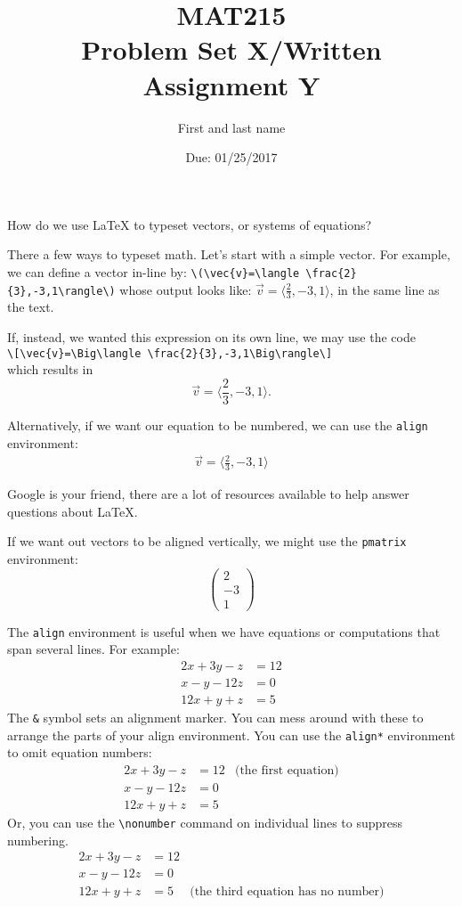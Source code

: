 \documentclass[12pt]{article}
\title{MAT215\\Problem Set X/Written Assignment Y}
\author{First and last name}
\date{Due: 01/25/2017}
\newenvironment{problem}[2][Problem]
{
	\begin{trivlist} 
		\item[\hskip \labelsep {\bfseries #1 #2:}]
	}
{
	\end{trivlist}
	}
\newenvironment{solution}[1][Solution]
{
	\begin{trivlist} 
		\item[\hskip \labelsep {\itshape #1:}]
	}
	{
	\end{trivlist}
}
\begin{document}
\maketitle
\newpage
%
%
\begin{problem}{7}
	How do we use {\LaTeX} to typeset vectors, or systems of equations?
\end{problem}
%
\begin{solution}
	There a few ways to typeset math. Let's start with a simple vector. For example, we can define a vector in-line by: \verb|\(\vec{v}=\langle \frac{2}{3},-3,1\rangle\)| whose output looks like: \(\vec{v}=\langle \frac{2}{3},-3,1\rangle\), in the same line as the text.
	
	If, instead, we wanted this expression on its own line, we may use the code\\
	\verb|\[\vec{v}=\Big\langle \frac{2}{3},-3,1\Big\rangle\]|\\
	which results in
	\[
	\vec{v}=\Bigg\langle \frac{2}{3},-3,1\Bigg\rangle.
	\]
	
	Alternatively, if we want our equation to be numbered, we can use the \verb|align| environment:
	\begin{align}
		\vec{v}=\Bigg\langle \frac{2}{3},-3,1\Bigg\rangle
	\end{align}
	
	Google is your friend, there are a lot of resources available to help answer questions about \LaTeX.
	
	If we want out vectors to be aligned vertically, we might use the \verb|pmatrix| environment:
	\[
	\begin{pmatrix} 2 \\ -3 \\ 1 \end{pmatrix}
	\]
	
	The \verb|align| environment is useful when we have equations or computations that span several lines. For example:
	\begin{align}
	2x+3y-z &= 12\\
	x-y-12z &= 0\\
	12x+y+z &= 5
	\end{align}
	The \verb|&| symbol sets an alignment marker. You can mess around with these to arrange the parts of your align environment. You can use the \verb|align*| environment to omit equation numbers:
	\begin{align*}
	2x+3y-z &= 12 & \text{(the first equation)}\\
	x-y-12z &= 0\\
	12x+y+z &= 5
	\end{align*}
	Or, you can use the \verb|\nonumber| command on individual lines to suppress numbering.
	\begin{align}
	2x+3y-z &= 12\\
	x-y-12z &= 0\\
	12x+y+z &= 5 & \text{(the third equation has no number)} \nonumber
	\end{align}
\end{solution}
\end{document}
